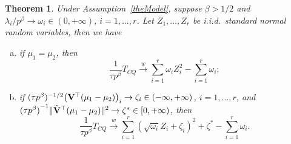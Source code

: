 \documentclass[times,sort&compress,3p]{elsarticle}
\theoremstyle{plain}
\newtheorem{theorem}{\quad\quad Theorem}
\theoremstyle{definition}
\theoremstyle{remark}
\begin{document}
\begin{theorem}\label{Chenstheory2}
 Under Assumption~\ref{theModel},
    suppose $\beta>1/2$ and $\lambda_i/p^\beta \to \omega_i\in(0,+\infty)$, $i=1,\ldots,r$.
    Let $Z_1,\ldots,Z_{r}$ be i.i.d.\ standard normal random variables,
     then we have
     \begin{enumerate}[(a)]
         \item
             if $\mu_1=\mu_2$, then
    $$
        \frac{1}{\tau p^{\beta}} T_{CQ}
        \xrightarrow{w}
        \sum_{i=1}^r \omega_i Z_i^2
            -
        \sum_{i=1}^r \omega_i;
    $$
         \item
             if $(\tau p^{\beta})^{-1/2}\big(\mathbf{V}^\top  (\mu_1-\mu_2)\big)_i\to \zeta_i\in(-\infty,+\infty)$, $i=1,\ldots,r$,
             and
    ${(\tau p^\beta)}^{-1}\|\tilde{\mathbf{V}}^\top  (\mu_1-\mu_2)\|^2\to \zeta^*\in [0,+\infty)$, then
    $$
        \frac{1}{\tau p^{\beta}} T_{CQ}
        \xrightarrow{w}
        \sum_{i=1}^r (\sqrt{\omega_i} Z_i+\zeta_i)^2+
\zeta^*
        -
        \sum_{i=1}^r \omega_i.
    $$
     \end{enumerate}
\end{theorem}
\end{document}
